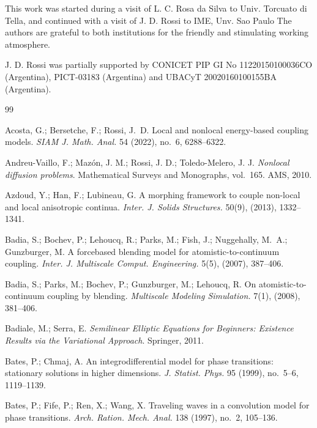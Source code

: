 \documentclass[reqno]{amsart}
\numberwithin{equation}{section}
\begin{document}
	This work was started during a visit of L. C. Rosa da Silva to Univ. Torcuato di Tella, and continued with a visit of 
	J. D. Rossi to IME, Unv. Sao Paulo The authors are grateful to both
	institutions for the friendly and stimulating working atmosphere. 
	
	
	 J. D. Rossi was partially supported by 
			CONICET PIP GI No 11220150100036CO
(Argentina), PICT-03183 (Argentina) and UBACyT 20020160100155BA (Argentina).



\begin{thebibliography}{99}

Acosta, G.; Bersetche, F.; Rossi, J.~D.
Local and nonlocal energy-based coupling models.
\emph{SIAM J. Math. Anal.} 54 (2022), no.~6, 6288--6322.

Andreu-Vaillo, F.; Maz\'on, J. M.; Rossi, J. D.; Toledo-Melero, J. J.
\emph{Nonlocal diffusion problems}.
Mathematical Surveys and Monographs, vol.~165. AMS, 2010.

Azdoud, Y.; Han, F.; Lubineau, G.
{A morphing framework to couple non-local and local anisotropic continua}.
{\it Inter. J. Solids Structures.} 50(9), (2013), 1332--1341.

Badia, S.; Bochev, P.; Lehoucq, R.; Parks, M.; Fish, J.; Nuggehally, M.~A.; Gunzburger, M.
{A forcebased blending model for atomistic-to-continuum coupling}.
{\it Inter. J. Multiscale Comput. Engineering.} 5(5), (2007), 387--406.

Badia, S.; Parks, M.; Bochev, P.; Gunzburger, M.; Lehoucq, R.
{On atomistic-to-continuum coupling by blending}.
{\it Multiscale Modeling Simulation.} 7(1), (2008), 381--406.

Badiale, M.; Serra, E.
\emph{Semilinear Elliptic Equations for Beginners: Existence Results via the Variational Approach}.
Springer, 2011.

Bates, P.; Chmaj, A.
An integrodifferential model for phase transitions: stationary solutions in higher dimensions.
\emph{J. Statist. Phys.} 95 (1999), no.~5--6, 1119--1139.

Bates, P.; Fife, P.; Ren, X.; Wang, X.
Traveling waves in a convolution model for phase transitions.
\emph{Arch. Ration. Mech. Anal.} 138 (1997), no.~2, 105--136.


\end{thebibliography}
\end{document}
